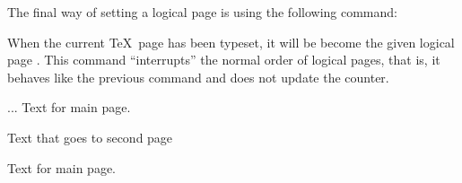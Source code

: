 The final way of setting a logical page is using the following
command:

\begin{command}{\pgfpagescurrentpagewillbelogicalpage{}}
  When the current \TeX\ page has been typeset, it will be become the given
  logical page . This command ``interrupts'' the normal
  order of logical pages, that is, it behaves like the previous
  command and does not update the  
  counter.

\begin{codeexample}
...
Text for main page.
\clearpage

Text that goes to second page
\clearpage

Text for main page.
\end{codeexample}
\end{command}

